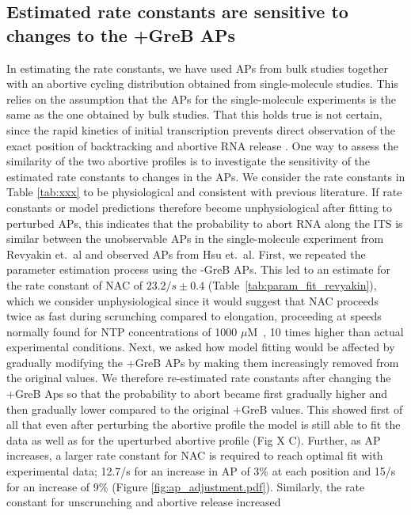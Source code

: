 \subsection{Estimated rate constants are sensitive to changes to the +GreB 
APs}
In estimating the rate constants, we have used APs from
bulk studies together with an abortive cycling distribution obtained from
single-molecule studies. This relies on the assumption that the APs for the
single-molecule experiments is the same as the one obtained by bulk studies.
That this holds true is not certain, since the rapid kinetics of initial
transcription prevents direct observation of the exact position of
backtracking and abortive RNA release \cite{margeat_direct_2006,
revyakin_abortive_2006}. One way to assess the similarity of the two abortive
profiles is to investigate the sensitivity of the estimated rate constants to
changes in the APs. We consider the rate constants in Table
\ref{tab:xxx} to be physiological and consistent with previous literature. If
rate constants or model predictions therefore become unphysiological after
fitting to perturbed APs, this indicates that the probability to abort RNA
along the ITS is similar between the unobservable APs in the single-molecule
experiment from Revyakin et.\ al and observed APs from Hsu et.\ al. First, we
repeated the parameter estimation process using the -GreB APs. This led to an
estimate for the rate constant of NAC of $23.2/s \pm 0.4$
(Table~\ref{tab:param_fit_revyakin}), which we consider unphysiological since
it would suggest that NAC proceeds twice as fast during scrunching compared to
elongation, proceeding at speeds normally found for NTP concentrations of 1000
$\mu$M~\cite{bai_mechanochemical_2007}, 10 times higher than actual
experimental conditions. Next, we asked how model fitting would be affected by
gradually modifying the +GreB APs by making them increasingly removed from the
original values. We therefore re-estimated rate constants after changing the
+GreB Aps so that the probability to abort became first gradually higher and
then gradually lower compared to the original +GreB values. This showed first
of all that even after perturbing the abortive profile the model is still able
to fit the data as well as for the uperturbed abortive profile (Fig X C).
Further, as AP increases, a larger rate constant for NAC is required to reach optimal
fit with experimental data; 12.7/s for an increase in AP of 3\% at each position
and 15/s for an increase of 9\% (Figure \ref{fig:ap_adjustment.pdf}).
Similarly, the rate constant for unscrunching and abortive release increased
